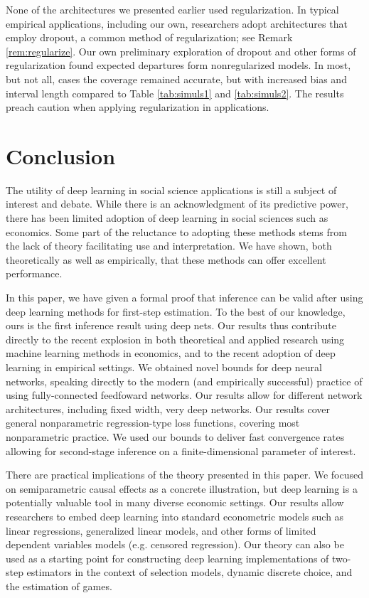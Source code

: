 \documentclass[11pt]{article}
\numberwithin{equation}{section}
\theoremstyle{definition}
\begin{document}
None of the architectures we presented earlier used regularization. In typical empirical applications, including our own, researchers adopt architectures that employ dropout, a common method of regularization; see Remark \ref{rem:regularize}. Our own preliminary exploration of dropout and other forms of regularization found expected departures form nonregularized models. In most, but not all, cases the coverage remained accurate, but with increased bias and interval length compared to Table \ref{tab:simuls1} and \ref{tab:simuls2}. The results preach caution when applying regularization in applications.




\section{Conclusion}
	\label{sec:conclusion}

The utility of deep learning in social science applications is still a subject of interest and debate. While there is an acknowledgment of its predictive power, there has been limited adoption of deep learning in social sciences such as economics. Some part of the reluctance to adopting these methods stems from the lack of theory facilitating use and interpretation. We have shown, both theoretically as well as empirically, that these methods can offer excellent performance.

In this paper, we have given a formal proof that inference can be valid after using deep learning methods for first-step estimation. To the best of our knowledge, ours is the first inference result using deep nets. Our results thus contribute directly to the recent explosion in both theoretical and applied research using machine learning methods in economics, and to the recent adoption of deep learning in empirical settings. We obtained novel bounds for deep neural networks, speaking directly to the modern (and empirically successful) practice of using fully-connected feedfoward networks. Our results allow for different network architectures, including fixed width, very deep networks. Our results cover general nonparametric regression-type loss functions, covering most nonparametric practice. We used our bounds to deliver fast convergence rates allowing for second-stage inference on a finite-dimensional parameter of interest.


There are practical implications of the theory presented in this paper. We focused on semiparametric causal effects as a concrete illustration, but deep learning is a potentially valuable tool in many diverse economic settings. Our results allow researchers to embed deep learning into standard econometric models such as linear regressions, generalized linear models, and other forms of limited dependent variables models (e.g. censored regression). Our theory can also be used as a starting point for constructing deep learning implementations of two-step estimators in the context of selection models, dynamic discrete choice, and the estimation of games.
\end{document}
